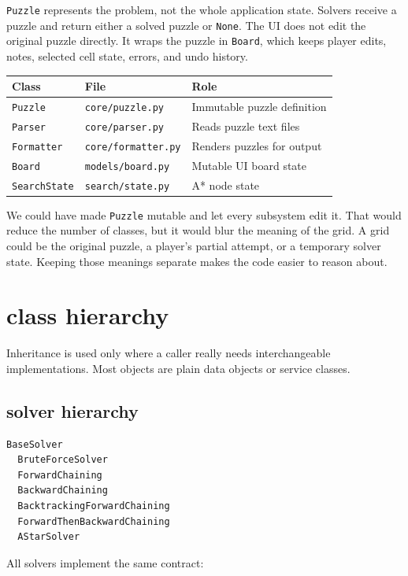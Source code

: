 \documentclass[11pt]{article}
\begin{document}
\texttt{Puzzle} represents the problem, not the whole application state.
Solvers receive a puzzle and return either a solved puzzle or \texttt{None}.
The UI does not edit the original puzzle directly. It wraps the puzzle in
\texttt{Board}, which keeps player edits, notes, selected cell state, errors,
and undo history.

\begin{table}[h]
\centering
\begin{tabular}{lll}
\toprule
Class & File & Role \\
\midrule
\texttt{Puzzle} & \texttt{core/puzzle.py} & Immutable puzzle definition \\
\texttt{Parser} & \texttt{core/parser.py} & Reads puzzle text files \\
\texttt{Formatter} & \texttt{core/formatter.py} & Renders puzzles for output \\
\texttt{Board} & \texttt{models/board.py} & Mutable UI board state \\
\texttt{SearchState} & \texttt{search/state.py} & A* node state \\
\bottomrule
\end{tabular}
\end{table}

We could have made \texttt{Puzzle} mutable and let every subsystem edit it.
That would reduce the number of classes, but it would blur the meaning of the
grid. A grid could be the original puzzle, a player's partial attempt, or a
temporary solver state. Keeping those meanings separate makes the code easier
to reason about.

\section{class hierarchy}

Inheritance is used only where a caller really needs interchangeable
implementations. Most objects are plain data objects or service classes.

\subsection{solver hierarchy}

\begin{verbatim}
BaseSolver
  BruteForceSolver
  ForwardChaining
  BackwardChaining
  BacktrackingForwardChaining
  ForwardThenBackwardChaining
  AStarSolver
\end{verbatim}

All solvers implement the same contract:
\end{document}
